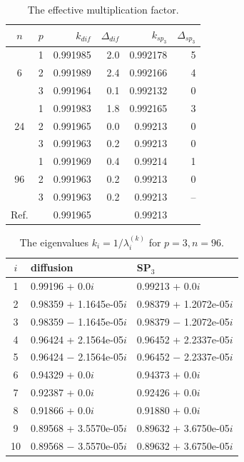 \documentclass[authoryear]{elsarticle}
\begin{document}
\begin{table}[h]
\caption{The effective multiplication factor.}
\label{tab:hwr_lambda}
\begin{center}
\begin{tabular}{c c r r r r}
\hline
$n$ & $p$ & $k_{dif}$ & $\Delta_{dif}$ &$k_{sp_3}$& $\Delta_{sp_3}$ \\
\hline
	& 1	& 0.991985&  2.0& 0.992178&   5\\
6	& 2	& 0.991989&  2.4& 0.992166&   4\\
	& 3	& 0.991964&  0.1& 0.992132&   0\\
\hline
	& 1	& 0.991983&  1.8& 0.992165&   3\\
24& 2	& 0.991965&  0.0& 0.99213&   0\\
	& 3	& 0.991963&  0.2& 0.99213&   0\\ 
\hline
	& 1	& 0.991969&  0.4& 0.99214&   1\\
96& 2	& 0.991963&  0.2& 0.99213&   0\\
	& 3	& 0.991963&  0.2& 0.99213&  --\\ 
\hline
Ref.&   & 0.991965&    & 0.99213&    \\ 
\hline
\end{tabular}
\end{center}
\end{table}

\begin{table}[h]
\caption{The eigenvalues $k_i=1/\lambda_i^{(k)}$ for $p=3, n=96$.}
\label{tab:hwr_lambda_10}
\begin{center}
\begin{tabular}{c l l }
\hline
$i$ & diffusion & SP$_3$  \\
\hline
1 & 0.99196 + 0.0$i$   & 0.99213 + 0.0$i$\\
2 & 0.98359 + 1.1645e-05$i$   & 0.98379 + 1.2072e-05$i$\\
3 & 0.98359 $-$ 1.1645e-05$i$ & 0.98379 $-$ 1.2072e-05$i$\\
4 & 0.96424 + 2.1564e-05$i$   & 0.96452 + 2.2337e-05$i$\\
5 & 0.96424 $-$ 2.1564e-05$i$ & 0.96452 $-$ 2.2337e-05$i$\\
6 & 0.94329 + 0.0$i$   & 0.94373 + 0.0$i$\\
7 & 0.92387 + 0.0$i$   & 0.92426 + 0.0$i$\\
8 & 0.91866 + 0.0$i$   & 0.91880 + 0.0$i$\\
9 & 0.89568 + 3.5570e-05$i$   & 0.89632 + 3.6750e-05$i$\\
10 & 0.89568 $-$ 3.5570e-05$i$& 0.89632 + 3.6750e-05$i$\\
\hline
\end{tabular}
\end{center}
\end{table}
\end{document}
